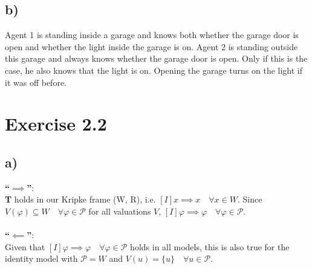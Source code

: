 \documentclass[a4paper]{article}
\begin{document}
\subsection{b)}
Agent 1 is standing inside a garage and knows both whether the garage door is open and whether the light inside the garage is on. Agent 2 is standing outside this garage and always knows whether the garage door is open. Only if this is the case, he also knows that the light is on. Opening the garage turns on the light if it was off before.
\section{Exercise 2.2}
\subsection{a)}
\textbf{``$\implies$''}:\\
\textbf{T} holds in our Kripke frame (W, R), i.e. $[I] x \implies x \quad \forall x \in W$. Since $V(\varphi) \subseteq W \quad \forall \varphi \in \mathcal{P}$ for all valuations $V$, $[I] \varphi \implies \varphi \quad \forall \varphi \in \mathcal{P}$.\\\\

\textbf{``$\impliedby$''}:\\
Given that $[I] \varphi \implies \varphi \quad \forall \varphi \in \mathcal{P}$ holds in all models, this is also true for the identity model with $\mathcal{P} = W$ and $V(u) = \{u\} \quad \forall u \in \mathcal{P}$.
\end{document}
